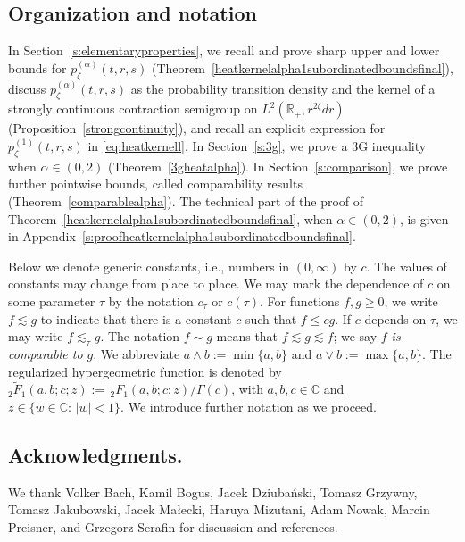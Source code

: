\documentclass[12pt,reqno,a4paper]{amsart}
\theoremstyle{definition}
\theoremstyle{remark}
\numberwithin{equation}{section}
\newcommand{\1}{\mathbbm{1}}
\newcommand{\C}{\mathbb{C}}
\newcommand{\R}{\mathbb{R}}
\begin{document}
\subsection*{Organization and notation}
\label{s:organization}

In Section~\ref{s:elementaryproperties}, we recall and prove sharp upper and lower bounds for $p_\zeta^{(\alpha)}(t,r,s)$ (Theorem~\ref{heatkernelalpha1subordinatedboundsfinal}), discuss $p_\zeta^{(\alpha)}(t,r,s)$ as the probability transition density and the kernel of a strongly continuous contraction semigroup on $L^2(\R_+,r^{2\zeta}dr)$ (Proposition~\ref{strongcontinuity}), and recall an explicit expression for $p_\zeta^{(1)}(t,r,s)$ in \eqref{eq:heatkernell}.
In Section~\ref{s:3g}, we prove a 3G inequality when $\alpha\in(0,2)$ (Theorem~\ref{3gheatalpha}).
In Section~\ref{s:comparison}, we prove further pointwise bounds, called comparability results (Theorem~\ref{comparablealpha}).
The technical part of the proof of Theorem~\ref{heatkernelalpha1subordinatedboundsfinal}, when $\alpha\in (0,2)$, is given in Appendix~\ref{s:proofheatkernelalpha1subordinatedboundsfinal}.



\medskip
Below we denote generic constants, i.e., numbers in $(0,\infty)$ by $c$. The values of constants may change from place to place. We may mark the dependence of $c$ on some parameter $\tau$ by the notation $c_\tau$ or $c(\tau)$. For functions $f,g\geq0$, we write $f\lesssim g$ to indicate that there is a constant $c$ such that $f\leq c g$. If $c$ depends on $\tau$, we may write $f\lesssim_\tau g$.
The notation $f\sim g$ means that $f\lesssim g\lesssim f$; we say \emph{$f$ is comparable to $g$}.\index{$\lesssim$}\index{$\sim$} We abbreviate $a\wedge b:=\min\{a,b\}$ and $a\vee b:=\max\{a,b\}$.\index{$\wedge$}\index{$\vee$}
The regularized hypergeometric function \cite[(15.2.1)]{NIST:DLMF} is denoted by $_2\tilde F_1(a,b;c;z) :=\, _2F_1(a,b;c;z)/\Gamma(c)$, with $a,b,c\in\C$ and $z\in\{w\in\C:\,|w|<1\}$.
We introduce further notation as we proceed.

\subsection*{Acknowledgments.} We thank Volker Bach, Kamil Bogus, Jacek Dziubański, Tomasz Grzywny, Tomasz Jakubowski, Jacek Ma\l{}ecki, Haruya Mizutani, Adam Nowak, Marcin Preisner, and Grzegorz Serafin for discussion and references.
\end{document}
